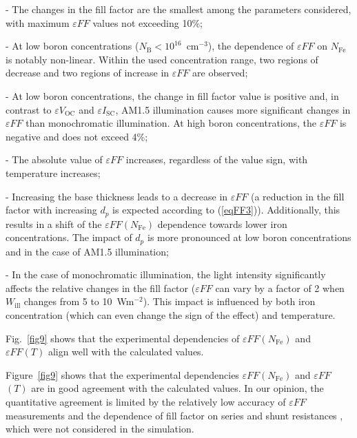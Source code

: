 \documentclass[a4paper,fleqn]{cas-sc}
\begin{document}
\noindent
- The changes in the fill factor are the smallest among the parameters considered,
with maximum $\varepsilon FF$ values not exceeding 10\%;

\noindent
- At low boron concentrations ($N_\mathrm{B}<10^{16}$~cm$^{-3}$),
the dependence of $\varepsilon FF$ on $N_\mathrm{Fe}$ is notably non-linear.
Within the used concentration range, two regions of decrease and two regions of increase in $\varepsilon FF$ are observed;

\noindent
- At low boron concentrations, the change in fill factor value is positive and,
in contrast to $\varepsilon V_\mathrm{OC}$ and $\varepsilon I_\mathrm{SC}$,
AM1.5 illumination causes more significant changes in $\varepsilon FF$ than monochromatic illumination.
At high boron concentrations, the $\varepsilon FF$ is negative and does not exceed 4\%;


\noindent
- The absolute value of $\varepsilon FF$ increases, regardless of the value sign, with temperature increases;


\noindent
- Increasing the base thickness leads to a decrease in $\varepsilon FF$ (a reduction in the fill factor with increasing $d_p$ is expected according to (\ref{eqFF3})). Additionally, this results in a shift of the $\varepsilon FF\left(N_\mathrm{Fe}\right)$ dependence towards lower iron concentrations.
The impact of $d_p$ is more pronounced at low boron concentrations and in the case of AM1.5 illumination;


\noindent
- In the case of monochromatic illumination, the light intensity significantly affects the relative changes in the fill factor
($\varepsilon FF$ can vary by a factor of 2 when $W_\mathrm{ill}$ changes from 5 to 10~Wm$^{-2}$).
This impact is influenced by both iron concentration (which can even change the sign of the effect) and temperature.

Fig.~\ref{fig9} shows that the experimental dependencies of  $\varepsilon FF\left(N_\mathrm{Fe}\right)$
and $\varepsilon FF\left(T\right)$ align well with the calculated values.

Figure~\ref{fig9} shows that the experimental dependencies $\varepsilon FF$$\left(N_\mathrm{Fe}\right)$ and $\varepsilon FF$$\left(T\right)$ are in good agreement with the calculated values.
In our opinion, the quantitative agreement is limited by the relatively low accuracy of $\varepsilon FF$ measurements
and the dependence of fill factor on series and shunt resistances \cite{Green1981,Green1982},
which were not considered in the simulation.
\end{document}
